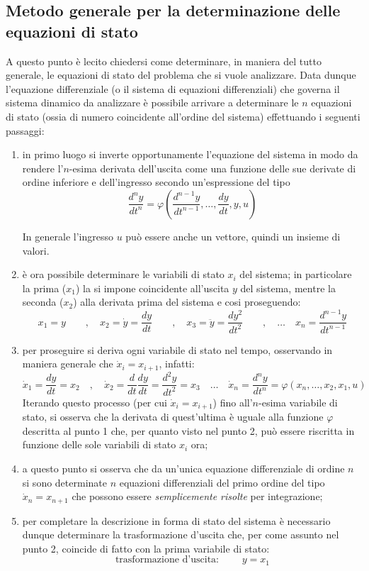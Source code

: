 	\subsection{Metodo generale per la determinazione delle equazioni di stato}
		A questo punto è lecito chiedersi come determinare, in maniera del tutto generale, le equazioni di stato del problema che si vuole analizzare. Data dunque l'equazione differenziale (o il sistema di equazioni differenziali) che governa il sistema dinamico da analizzare è possibile arrivare a determinare le $n$ equazioni di stato (ossia di numero coincidente all'ordine del sistema) effettuando i seguenti passaggi:
		\begin{enumerate}
			\item in primo luogo si inverte opportunamente l'equazione del sistema in modo da rendere l'$n$-esima derivata dell'uscita come una funzione delle sue derivate di ordine inferiore e dell'ingresso secondo un'espressione del tipo
			\[ \frac{d^n y}{dt^n} = \varphi \left( \frac{d^{n-1}y}{dt^{n-1}}, \dots, \frac{dy}{dt}, y, u \right)  \]
			\begin{nota}
				In generale l'ingresso $u$ può essere anche un vettore, quindi un insieme di valori.
			\end{nota}
			
			\item è ora possibile determinare le variabili di stato $x_i$ del sistema; in particolare la prima ($x_1$) la si impone coincidente all'uscita $y$ del sistema, mentre la seconda ($x_2$) alla derivata prima del sistema e cosi proseguendo:
			\[ x_1 = y \qquad,\quad x_2 = \dot y = \frac{dy}{dt} \qquad, \quad x_3 = \ddot y = \frac{dy^2}{dt^2} \qquad, \quad \dots \quad x_n = \frac{d^{n-1}y}{dt^{n-1}} \]
			
			\item per proseguire si deriva ogni variabile di stato nel tempo, osservando in maniera generale che $\dot x_{i} = x_{i+1}$, infatti:
			\[ \dot x_1 = \frac{dy}{dt} = x_2 \quad, \quad \dot x_2 = \frac d {dt} \frac{dy}{dt} = \frac{d^2y}{dt^2} = x_3 \quad \dots \quad \dot x_n = \frac{d^n y}{dt^n} =\varphi \left( x_n, \dots, x_2,x_1, u \right) \]
			Iterando questo processo (per cui $\dot x_i = x_{i+1}$) fino all'$n$-esima variabile di stato, si osserva che la derivata di quest'ultima è uguale alla funzione $\varphi$ descritta al punto 1 che, per quanto visto nel punto 2, può essere riscritta in funzione delle sole variabili di stato $x_i$ ora;
			
			\item a questo punto si osserva che da un'unica equazione differenziale di ordine $n$ si sono determinate $n$ equazioni differenziali del primo ordine del tipo $\dot x_n = x_{n+1}$ che possono essere \textit{semplicemente risolte} per integrazione;
			
			\item per completare la descrizione in forma di stato del sistema è necessario dunque determinare la trasformazione d'uscita che, per come assunto nel punto 2, coincide di fatto con la prima variabile di stato:
			\[ \textrm{trasformazione d'uscita: } \qquad y = x_1 \]
		\end{enumerate}
		
